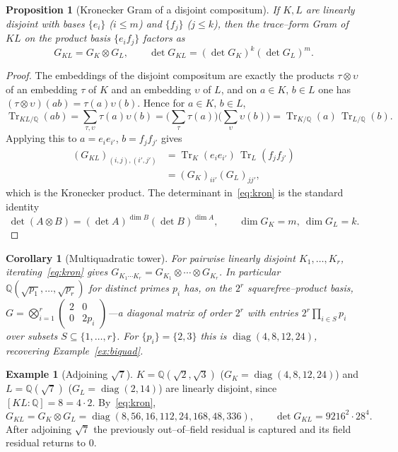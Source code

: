 \documentclass[11pt]{article}
\theoremstyle{plain}
\newtheorem{proposition}[theorem]{Proposition}
\newtheorem{corollary}[theorem]{Corollary}
\theoremstyle{definition}
\newtheorem{example}[theorem]{Example}
\theoremstyle{remark}
\newcommand{\Q}{\mathbb{Q}}
\newcommand{\K}{K}
\newcommand{\Tr}{\operatorname{Tr}}
\newcommand{\GG}{G}
\DeclareMathOperator{\diag}{diag}
\begin{document}
\begin{proposition}[Kronecker Gram of a disjoint compositum]\label{prop:kron}
If $\K,L$ are linearly disjoint with bases $\{e_i\}$ ($i\le m$) and $\{f_j\}$ ($j\le k$), then the
trace--form Gram of $\K L$ on the product basis $\{e_if_j\}$ factors as
\begin{equation}\label{eq:kron}
  \GG_{\K L}=\GG_\K\otimes\GG_L,\qquad
  \det\GG_{\K L}=(\det\GG_\K)^{k}(\det\GG_L)^{m}.
\end{equation}
\end{proposition}
\begin{proof}
The embeddings of the disjoint compositum are exactly the products $\tau\otimes\upsilon$ of an embedding
$\tau$ of $\K$ and an embedding $\upsilon$ of $L$, and on $a\in\K,\,b\in L$ one has
$(\tau\otimes\upsilon)(ab)=\tau(a)\upsilon(b)$. Hence for $a\in\K,\,b\in L$,
\[
  \Tr_{\K L/\Q}(ab)=\sum_{\tau,\upsilon}\tau(a)\upsilon(b)
  =\Big(\sum_\tau\tau(a)\Big)\Big(\sum_\upsilon\upsilon(b)\Big)=\Tr_{\K/\Q}(a)\,\Tr_{L/\Q}(b).
\]
Applying this to $a=e_ie_{i'}$, $b=f_jf_{j'}$ gives
\begin{align*}
  (\GG_{\K L})_{(i,j),(i',j')}
  &=\Tr_\K(e_ie_{i'})\,\Tr_L(f_jf_{j'})\\
  &=(\GG_\K)_{ii'}(\GG_L)_{jj'},
\end{align*}
which is the Kronecker product. The determinant in~\eqref{eq:kron} is the standard identity
\[
  \det(A\otimes B)=(\det A)^{\dim B}(\det B)^{\dim A},\qquad \dim\GG_\K=m,\ \dim\GG_L=k.
\]
\end{proof}

\begin{corollary}[Multiquadratic tower]\label{cor:tower}
For pairwise linearly disjoint $\K_1,\dots,\K_r$, iterating~\eqref{eq:kron} gives
$\GG_{\K_1\cdots\K_r}=\GG_{\K_1}\otimes\cdots\otimes\GG_{\K_r}$. In particular
$\Q(\sqrt{p_1},\dots,\sqrt{p_r})$ for distinct primes $p_i$ has, on the $2^r$ squarefree--product basis,
$\GG=\bigotimes_{i=1}^r\left(\begin{smallmatrix}2&0\\0&2p_i\end{smallmatrix}\right)$---a diagonal matrix of
order $2^r$ with entries $2^r\prod_{i\in S}p_i$ over subsets $S\subseteq\{1,\dots,r\}$. For $\{p_i\}=\{2,3\}$
this is $\diag(4,8,12,24)$, recovering Example~\ref{ex:biquad}.
\end{corollary}

\begin{example}[Adjoining $\sqrt7$]\label{ex:adjoin7}
$\K=\Q(\sqrt2,\sqrt3)$ ($\GG_\K=\diag(4,8,12,24)$) and $L=\Q(\sqrt7)$ ($\GG_L=\diag(2,14)$) are linearly
disjoint, since $[\K L:\Q]=8=4\cdot 2$. By~\eqref{eq:kron},
\[
  \GG_{\K L}=\GG_\K\otimes\GG_L=\diag(8,56,16,112,24,168,48,336),\qquad
  \det\GG_{\K L}=9216^2\cdot 28^4 .
\]
After adjoining $\sqrt7$ the previously out--of--field residual is captured and its field residual returns
to $0$.
\end{example}
\end{document}
